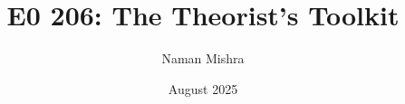 \documentclass[12pt]{report}
\title{E0 206: The Theorist's Toolkit}
\author{Naman Mishra}
\date{August 2025}
\begin{document}
\maketitle
\tableofcontents
\listoflecture
    
\end{document}
